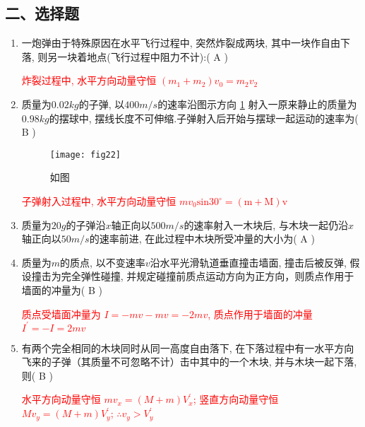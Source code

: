 \subsection*{二、选择题}
\begin{enumerate}
    \item 一炮弹由于特殊原因在水平飞行过程中, 突然炸裂成两块, 其中一块作自由下落, 则另一块着地点(飞行过程中阻力不计):( A )   
    \begin{note}
        \textcolor{red}{炸裂过程中, 水平方向动量守恒 $(m_1+m_2)v_0 = m_2v_2$}
    \end{note}  
    \item 质量为$0.02kg$的子弹, 以$400 m/s$的速率沿图示方向 \ref{Fig:22} 射入一原来静止的质量为$0.98kg$的摆球中, 摆线长度不可伸缩.子弹射入后开始与摆球一起运动的速率为( B )
    \begin{figure}[H]
        \centering
        \texttt{[image: fig22]}
            \caption{如图}\label{Fig:22}
    \end{figure}
    \begin{note}
        \textcolor{red}{子弹射入过程中, 水平方向动量守恒 $mv_0\mathrm{sin 30^\circ = (m+M)v}$}
    \end{note}
    \item 质量为$20 g$的子弹沿$x$轴正向以$500 m/s$的速率射入一木块后, 与木块一起仍沿$x$轴正向以$50 m/s$的速率前进, 在此过程中木块所受冲量的大小为( A )                                                        
    \item 质量为$m$的质点, 以不变速率$v$沿水平光滑轨道垂直撞击墙面, 撞击后被反弹, 假设撞击为完全弹性碰撞, 并规定碰撞前质点运动方向为正方向，则质点作用于墙面的冲量为( B )
    \begin{note}
        \textcolor{red}{质点受墙面冲量为 $I=-mv-mv = -2mv$, 质点作用于墙面的冲量 $I^{'}=-I=2mv$}
    \end{note}
    \item 有两个完全相同的木块同时从同一高度自由落下, 在下落过程中有一水平方向飞来的子弹（其质量不可忽略不计）击中其中的一个木块, 并与木块一起下落, 则( B )  
   \begin{note}
       \textcolor{red}{水平方向动量守恒 $mv_x = (M+m)V_x^{'}$; 竖直方向动量守恒 $Mv_y = (M+m)V_y^{'}$; $\therefore v_y>V_y^{'}$}

\end{note}
\end{enumerate}
